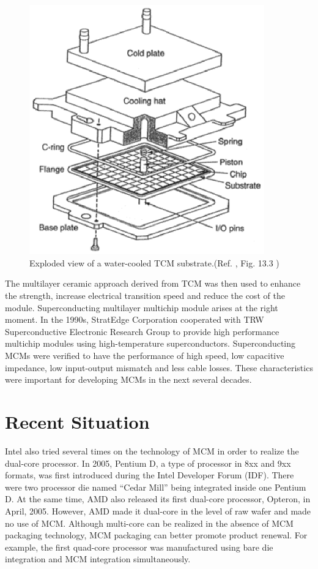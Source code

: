 \begin{spacing}{1.5}
\begin{figure}[ht]
	\centering
	\includegraphics[width=4in, fbox]{Chapter1/TCM_substrate.eps}
	\caption{Exploded view of a water-cooled TCM substrate.(Ref. \cite{Mainframe_Packaging_TCM}, Fig. 13.3 )}
	\label{fig:TCMwatercool} 
\end{figure}

The multilayer ceramic approach derived from TCM was then used to enhance the strength, increase electrical transition speed and reduce the cost of the module. Superconducting multilayer multichip module arises at the right moment. In the 1990s, StratEdge Corporation cooperated with TRW Superconductive Electronic Research Group to provide high performance multichip modules using high-temperature superconductors.\cite{High_temperature_superconducting} Superconducting MCMs were verified to have the performance of high speed, low capacitive impedance, low input-output mismatch and less cable losses. These characteristics were important for developing MCMs in the next several decades.

\section{Recent Situation}

Intel also tried several times on the technology of MCM in order to realize the dual-core processor. In 2005, Pentium D, a type of processor in 8xx and 9xx formats, was first introduced during the Intel Developer Forum (IDF). There were two processor die named “Cedar Mill” being integrated inside one Pentium D. At the same time, AMD also released its first dual-core processor, Opteron, in April, 2005. However, AMD made it dual-core in the level of raw wafer and made no use of MCM. Although multi-core can be realized in the absence of MCM packaging technology, MCM packaging can better promote product renewal. For example, the first quad-core processor was manufactured using bare die integration and MCM integration simultaneously.


\end{spacing}
